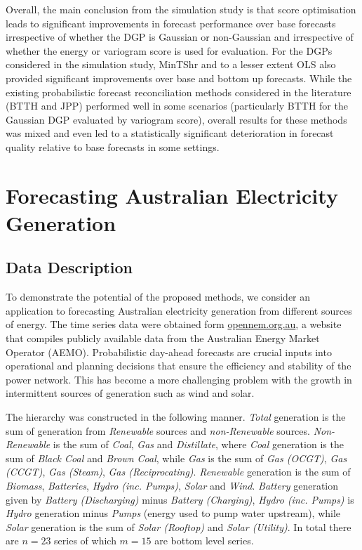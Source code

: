 \documentclass[12pt]{article}
\theoremstyle{definition}
\begin{document}
Overall, the main conclusion from the simulation study is that score optimisation leads to significant improvements in forecast performance over base forecasts irrespective of whether the DGP is Gaussian or non-Gaussian and irrespective of whether the energy or variogram score is used for evaluation.  For the DGPs considered in the simulation study, MinTShr and to a lesser extent OLS also provided significant improvements over base and bottom up forecasts.  While the existing probabilistic forecast reconciliation methods considered in the literature (BTTH and JPP) performed well in some scenarios (particularly BTTH for the Gaussian DGP evaluated by variogram score), overall results for these methods was mixed and even led to a statistically significant deterioration in forecast quality relative to base forecasts in some settings.

\section{Forecasting Australian Electricity Generation}\label{sec:Application}

\subsection{Data Description}\label{sec:datadesc}

To demonstrate the potential of the proposed methods, we consider an application to forecasting Australian electricity generation from different sources of energy.  The time series data were obtained form \url{opennem.org.au}, a website that compiles publicly available data from the Australian Energy Market Operator (AEMO).  Probabilistic day-ahead forecasts are crucial inputs into operational and planning decisions that ensure the efficiency and stability of the power network.  This has become a more challenging problem with the growth in intermittent sources of generation such as wind and solar.

The hierarchy was constructed in the following manner.  \textit{Total} generation is the sum of generation from \textit{Renewable} sources and \textit{non-Renewable} sources.  \textit{Non-Renewable} is the sum of \textit{Coal}, \textit{Gas} and \textit{Distillate}, where \textit{Coal} generation is the sum of \textit{Black Coal} and \textit{Brown Coal}, while \textit{Gas} is the sum of \textit{Gas (OCGT)}, \textit{Gas (CCGT)}, \textit{Gas (Steam)}, \textit{Gas (Reciprocating)}. \textit{Renewable} generation is the sum of \textit{Biomass}, \textit{Batteries}, \textit{Hydro (inc. Pumps)}, \textit{Solar} and \textit{Wind}.  \textit{Battery} generation given by \textit{Battery (Discharging)} minus \textit{Battery (Charging)}, \textit{Hydro (inc. Pumps)} is \textit{Hydro} generation minus \textit{Pumps} (energy used to pump water upstream), while \textit{Solar} generation is the sum of \textit{Solar (Rooftop)} and \textit{Solar (Utility)}.  In total there are $n=23$ series of which $m=15$ are bottom level series.
\end{document}
